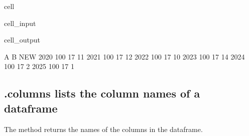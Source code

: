 \documentclass[letterpaper,10pt,english]{jupyterBook}
\begin{document}
\begin{sphinxuseclass}{cell}\begin{sphinxVerbatimInput}

\begin{sphinxuseclass}{cell_input}
\begin{sphinxVerbatim}[commandchars=\\\{\}]
\PYG{p}{[}\PYG{p}{]}
\end{sphinxVerbatim}

\end{sphinxuseclass}\end{sphinxVerbatimInput}
\begin{sphinxVerbatimOutput}

\begin{sphinxuseclass}{cell_output}
\begin{sphinxVerbatim}[commandchars=\\\{\}]
        A   B  NEW
2020  100  17   11
2021  100  17   12
2022  100  17   10
2023  100  17   14
2024  100  17    2
2025  100  17    1
\end{sphinxVerbatim}

\end{sphinxuseclass}\end{sphinxVerbatimOutput}

\end{sphinxuseclass}

\subsection{.columns lists the column names of a dataframe}
\label{\detokenize{content/04_PythonEssentials/PythonPandasDataframes:columns-lists-the-column-names-of-a-dataframe}}
\sphinxAtStartPar
The method  returns the names of the columns in the dataframe.
\end{document}
